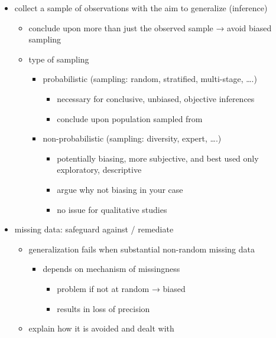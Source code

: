 \documentclass[
]{article}
\providecommand{\tightlist}{%
  \setlength{\itemsep}{0pt}\setlength{\parskip}{0pt}}
\begin{document}
\begin{itemize}
\tightlist
\item
  collect a sample of observations with the aim to generalize
  (inference)

  \begin{itemize}
  \tightlist
  \item
    conclude upon more than just the observed sample → avoid biased
    sampling
  \item
    type of sampling

    \begin{itemize}
    \tightlist
    \item
      probabilistic (sampling: random, stratified, multi-stage, \ldots.)

      \begin{itemize}
      \tightlist
      \item
        necessary for conclusive, unbiased, objective inferences
      \item
        conclude upon population sampled from
      \end{itemize}
    \item
      non-probabilistic (sampling: diversity, expert, \ldots.)

      \begin{itemize}
      \tightlist
      \item
        potentially biasing, more subjective, and best used only
        exploratory, descriptive
      \item
        argue why not biasing in your case
      \item
        no issue for qualitative studies
      \end{itemize}
    \end{itemize}
  \end{itemize}
\item
  missing data: safeguard against / remediate

  \begin{itemize}
  \tightlist
  \item
    generalization fails when substantial non-random missing data

    \begin{itemize}
    \tightlist
    \item
      depends on mechanism of missingness

      \begin{itemize}
      \tightlist
      \item
        problem if not at random → biased
      \item
        results in loss of precision
      \end{itemize}
    \end{itemize}
  \item
    explain how it is avoided and dealt with


\end{itemize}
\end{itemize}
\end{document}

